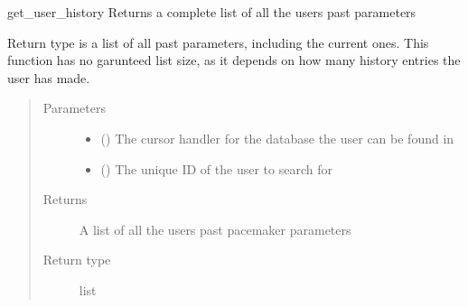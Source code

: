 \documentclass[letterpaper,10pt,english]{sphinxmanual}
\begin{document}
\begin{fulllineitems}
\label{\detokenize{index:data.database.get_user_history}}
get\_user\_history Returns a complete list of all the users past parameters

Return type is a list of all past parameters, including the current ones.
This function has no garunteed list size, as it depends on how many history
entries the user has made.
\begin{quote}\begin{description}
\item[{Parameters}] \leavevmode\begin{itemize}
\item {} 
 () \textendash{} The cursor handler for the database the user can be found in

\item {} 
 () \textendash{} The unique ID of the user to search for

\end{itemize}

\item[{Returns}] \leavevmode
A list of all the users past pacemaker parameters

\item[{Return type}] \leavevmode
list

\end{description}\end{quote}

\end{fulllineitems}

\end{document}

